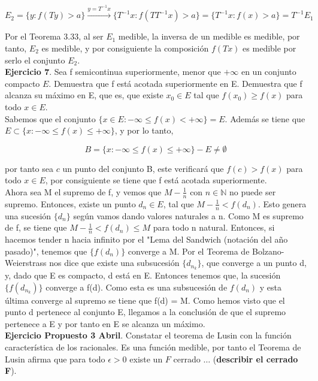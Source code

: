 \documentclass{article}
\begin{document}
\begin{equation*}
E_2=\{y: f(Ty) > a\} \xrightarrow{y=T^{-1}x} \{T^{-1}x:f(TT^{-1}x) > a\} = \{T^{-1}x:f(x) > a\} = T^{-1}E_1
\end{equation*}

Por el Teorema 3.33, al ser $E_1$ medible, la inversa de un medible es medible, por tanto, $E_2$ es medible, y por consiguiente la composición $f(Tx)$ es medible por serlo el conjunto $E_2$. \\

\textbf{Ejercicio 7}. Sea f semicontinua superiormente, menor que $+\infty$ en un conjunto compacto $E$. Demuestra que f está acotada superiormente en E. Demuestra que f alcanza su máximo en E, que es, que existe $x_0 \in E$ tal que $f(x_0) \geq f(x)$ para todo $x \in E$.\\

Sabemos que el conjunto $\{x \in E: -\infty \leq f(x) < +\infty\} = E$. Además se tiene que $E \subset \{x: -\infty \leq f(x) \leq +\infty\}$, y por lo tanto,

\begin{equation*}
B = \{x: -\infty \leq f(x) \leq +\infty\} - E \neq \emptyset
\end{equation*}

por tanto sea $c$ un punto del conjunto B, este verificará que $f(c) > f(x)$ para todo $x \in E$, por consiguiente se tiene que f está acotada superiormente. \\

Ahora sea M el supremo de f, y vemos que $M-\frac{1}{n}$ con $n \in \mathbb{N}$ no puede ser supremo. Entonces, existe un punto $d_n \in E$, tal que $M-\frac{1}{n} < f(d_n)$. Esto genera una sucesión $\{d_n\}$ según vamos dando valores naturales a n. Como M es supremo de f, se tiene que $M - \frac{1}{n} < f(d_n) \leq M$ para todo n natural. Entonces, si hacemos tender n hacia infinito por el "Lema del Sandwich (notación del año pasado)", tenemos que $\{f(d_n)\}$ converge a M. Por el Teorema de Bolzano-Weierstrass nos dice que existe una subsucesión  $\{d_{n_k}\}$, que converge a un punto d, y, dado que E es compacto, d está en E. Entonces tenemos que, la sucesión $\{f(d_{n_k})\}$ converge a f(d). Como esta es una subsucesión de $f(d_n)$ y esta última converge al supremo se tiene que f(d) = M. Como hemos visto que el punto d pertenece al conjunto E, llegamos a la conclusión de que el supremo pertenece a E y por tanto en E se alcanza un máximo. \\

\textbf{Ejercicio Propuesto 3 Abril}. Constatar el teorema de Lusin con la función característica de los racionales. Es una función medible, por tanto el Teorema de Lusin afirma que para todo $\epsilon > 0$ existe un $F$ cerrado $\ldots$ (\textbf{describir el cerrado F}). \\
\end{document}
